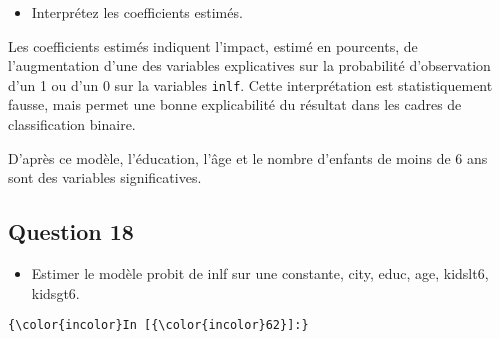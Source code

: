 \documentclass[11pt]{article}
\providecommand{\tightlist}{%
      \setlength{\itemsep}{0pt}\setlength{\parskip}{0pt}}
\begin{document}
    \begin{itemize}
\tightlist
\item
  Interprétez les coefficients estimés.
\end{itemize}

    Les coefficients estimés indiquent l'impact, estimé en pourcents, de
l'augmentation d'une des variables explicatives sur la probabilité
d'observation d'un 1 ou d'un 0 sur la variables \texttt{inlf}. Cette
interprétation est statistiquement fausse, mais permet une bonne
explicabilité du résultat dans les cadres de classification binaire.

D'après ce modèle, l'éducation, l'âge et le nombre d'enfants de moins de
6 ans sont des variables significatives.

    \subsection{Question 18}\label{question-18}

\begin{itemize}
\tightlist
\item
  Estimer le modèle probit de inlf sur une constante, city, educ, age,
  kidslt6, kidsgt6. 
\end{itemize}

    \begin{Verbatim}[commandchars=\\\{\}]
{\color{incolor}In [{\color{incolor}62}]:} 
\end{Verbatim}
\end{document}
